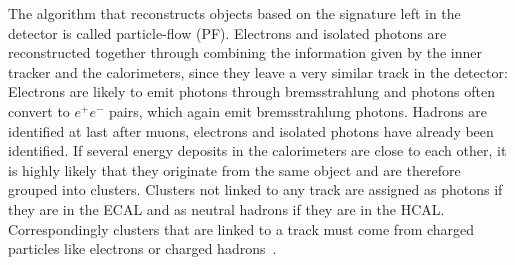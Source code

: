 The algorithm that reconstructs objects based on the signature left in the detector is called particle-flow (PF).
Electrons and isolated photons are reconstructed together through combining the information given by the inner tracker and the calorimeters, since they leave a very similar track
in the detector: Electrons are likely to emit photons through bremsstrahlung and photons often convert to $e^+e^-$ pairs, which again emit bremsstrahlung photons. 
Hadrons are identified at last after muons, electrons and isolated photons have already been identified.
If several energy deposits in the calorimeters are close to each other, it is highly likely that they originate from the same object and are therefore grouped into clusters.
Clusters not linked to any track are assigned as photons if they are in the ECAL and as neutral hadrons if they are in the HCAL. 
Correspondingly clusters that are linked to a track must come from charged particles like electrons or charged hadrons~\cite{CMS:2017pf}. 











